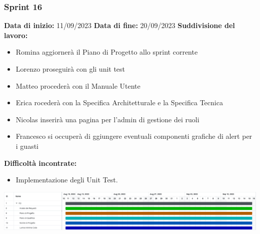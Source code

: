 \documentclass[a4paper, 12pt]{article}
\begin{document}
\subsubsection{Sprint 16}
\textbf{Data di inizio:} 11/09/2023\newline
\textbf{Data di fine:} 20/09/2023\newline
\newline
\textbf{Suddivisione del lavoro:}
\begin{itemize}
	\item Romina aggiornerà il Piano di Progetto allo sprint corrente
	\item Lorenzo proseguirà con gli unit test
	\item Matteo procederà con il Manuale Utente
	\item Erica rocederà con la Specifica Architetturale e la Specifica Tecnica
	\item Nicolas inserirà una pagina per l’admin di gestione dei ruoli 
	\item Francesco si occuperà di ggiungere eventuali componenti grafiche di alert per i guasti
\end{itemize}
\textbf{Difficoltà incontrate:}
\begin{itemize}
	\item Implementazione degli Unit Test.
\end{itemize}
\includegraphics[scale=0.178]{PB_4.png}\newline
\newline
\end{document}
